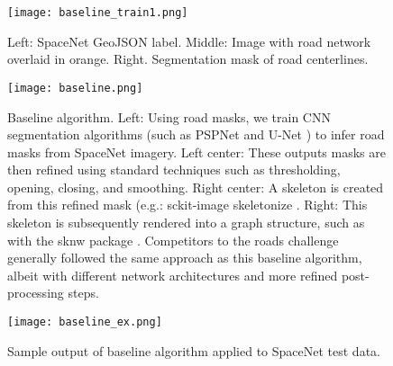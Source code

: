 \documentclass{article}
\begin{document}
\begin{figure}[h]
  \centering
     \texttt{[image: baseline\_train1.png]}
  \caption{Left: SpaceNet GeoJSON label.  Middle: Image with road network overlaid in orange.  Right. Segmentation mask of road centerlines.}
    \label{fig:baseline_train}
\end{figure}


\begin{figure}[h]
  \centering
     \texttt{[image: baseline.png]}
  \caption{Baseline algorithm.  Left: Using road masks, we train CNN segmentation algorithms (such as PSPNet \cite{pspnet} and U-Net \cite{unet}) to infer road masks from SpaceNet imagery.  Left center: These outputs masks are then refined using standard techniques such as thresholding, opening, closing, and smoothing.  Right center: A skeleton is created from this refined mask (e.g.: sckit-image skeletonize \cite{skimage}.
Right: This skeleton is subsequently rendered into a graph structure, such as with the sknw package \cite{sknw}.  
  Competitors to the roads challenge generally followed the same approach as this baseline algorithm, albeit with different network architectures and more refined post-processing steps.
}
    \label{fig:baseline}
\end{figure}


\begin{figure}[h]
  \centering
     \texttt{[image: baseline\_ex.png]}
  \caption{Sample output of baseline algorithm applied to SpaceNet test data.}
    \label{fig:baseline_ex}
\end{figure}
\end{document}
